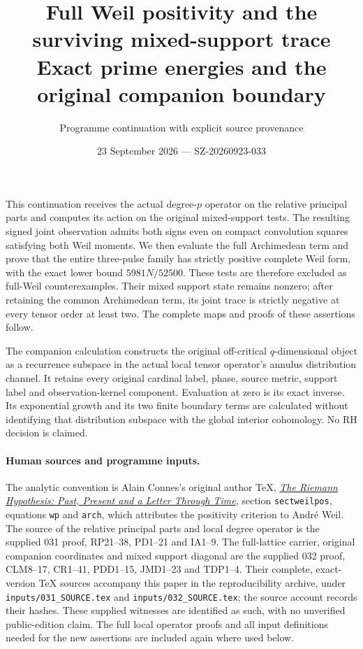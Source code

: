 \documentclass[11pt]{article}
\title{Full Weil positivity and the surviving mixed-support trace\\
\large Exact prime energies and the original companion boundary}
\author{Programme continuation with explicit source provenance}
\date{23 September 2026 --- SZ-20260923-033}
\begin{document}
\maketitle

This continuation receives the actual degree-$p$ operator on the
relative principal parts and computes its action on the original
mixed-support tests. The resulting signed joint observation admits
both signs even on compact convolution squares satisfying both Weil
moments. We then evaluate the full Archimedean term and prove that
the entire three-pulse family has strictly positive complete Weil
form, with the exact lower bound $5981N/52500$. These tests are
therefore excluded as full-Weil counterexamples. Their mixed support
state remains nonzero; after retaining the common Archimedean term,
its joint trace is strictly negative at every tensor order at least
two. The complete maps and proofs of these assertions follow.

The companion calculation constructs the original off-critical
$q$-dimensional object as a recurrence subspace in the actual
local tensor operator's annulus distribution channel. It retains
every original cardinal label, phase, source metric, support label
and observation-kernel component. Evaluation at zero is its exact
inverse. Its exponential growth and its two finite boundary terms
are calculated without identifying that distribution subspace with
the global interior cohomology. No RH decision is claimed.

\paragraph{Human sources and programme inputs.}
The analytic convention is Alain Connes's original author TeX,
\href{https://arxiv.org/abs/2602.04022v1}{\emph{The Riemann Hypothesis:
Past, Present and a Letter Through Time}}, section
\texttt{sectweilpos}, equations \texttt{wp} and \texttt{arch},
which attributes the positivity criterion to Andr\'e Weil.
The source of the relative principal parts and local degree operator
is the supplied 031 proof, RP21--38, PD1--21 and IA1--9.
The full-lattice carrier, original companion coordinates and mixed
support diagonal are the supplied 032 proof, CLM8--17, CR1--41,
PDD1--15, JMD1--23 and TDP1--4. Their complete, exact-version TeX
sources accompany this paper in the reproducibility archive,
under \texttt{inputs/031\_SOURCE.tex} and
\texttt{inputs/032\_SOURCE.tex}; the source account records their
hashes. These supplied witnesses are identified as such, with no
unverified public-edition claim. The full local operator proofs and
all input definitions needed for the new assertions are included
again where used below.
\end{document}
